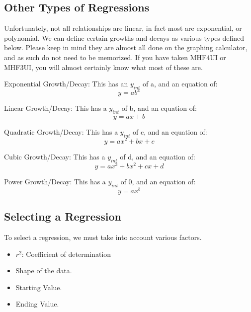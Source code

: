     \subsection{Other Types of Regressions}
    Unfortunately, not all relationships are linear, in fact most are exponential, or polynomial.
    We can define certain growths and decays as various types defined below.
    Please keep in mind they are almost all done on the graphing calculator, and as such do not need to be memorized.
    If you have taken MHF4UI or MHF3UI, you will almost certainly know what most of these are.
    \begin{definition}
        Exponential Growth/Decay: This has an $y_{int}$ of a, and an equation of:
        \begin{equation*}
            y = ab^{x}
        \end{equation*}
    \end{definition}
    \begin{definition}
        Linear Growth/Decay: This has a $y_{int}$ of b, and an equation of:
        \begin{equation*}
            y = ax+b
        \end{equation*}
    \end{definition}
    \begin{definition}
        Quadratic Growth/Decay: This has a $y_{int}$ of c, and an equation of:
        \begin{equation*}
            y = ax^{2} + bx + c
        \end{equation*}
    \end{definition}
    \begin{definition}
        Cubic Growth/Decay: This has a $y_{int}$ of d, and an equation of:
        \begin{equation*}
            y = ax^{3} + bx^{2} + cx + d
        \end{equation*}
    \end{definition}
    \begin{definition}
        Power Growth/Decay: This has a $y_{int}$ of 0, and an equation of:
        \begin{equation*}
            y = ax^{b}
        \end{equation*}
    \end{definition}
    
    \subsection{Selecting a Regression}
    To select a regression, we must take into account various factors.
    \begin{itemize}
        \item $r^{2}$: Coefficient of determination
        \item Shape of the data.
        \item Starting Value.
        \item Ending Value.
    \end{itemize}
    
